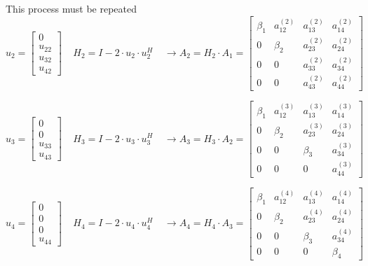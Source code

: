 This process must be repeated
\begin{equation}
u_2 =
\begin{bmatrix}
0\\
u_{22}\\
u_{32}\\
u_{42}
\end{bmatrix}
\;\;\;\;
H_2 = I - 2\cdot u_2\cdot u_2^H
\;\;\;\;
\rightarrow A_2 = H_2\cdot A_1 =
\begin{bmatrix}
\beta_1 & a_{12}^{(2)} & a_{13}^{(2)} & a_{14}^{(2)}\\
0 & \beta_2 & a_{23}^{(2)} & a_{24}^{(2)}\\
0 & 0 & a_{33}^{(2)} & a_{34}^{(2)}\\
0 & 0 & a_{43}^{(2)} & a_{44}^{(2)}
\end{bmatrix}
\end{equation}

\begin{equation}
u_3 =
\begin{bmatrix}
0\\
0\\
u_{33}\\
u_{43}
\end{bmatrix}
\;\;\;\;
H_3 = I - 2\cdot u_3\cdot u_3^H
\;\;\;\;
\rightarrow A_3 = H_3\cdot A_2 =
\begin{bmatrix}
\beta_1 & a_{12}^{(3)} & a_{13}^{(3)} & a_{14}^{(3)}\\
0 & \beta_2 & a_{23}^{(3)} & a_{24}^{(3)}\\
0 & 0 & \beta_3 & a_{34}^{(3)}\\
0 & 0 & 0 & a_{44}^{(3)}
\end{bmatrix}
\end{equation}

\begin{equation}
u_4 =
\begin{bmatrix}
0\\
0\\
0\\
u_{44}
\end{bmatrix}
\;\;\;\;
H_4 = I - 2\cdot u_4\cdot u_4^H
\;\;\;\;
\rightarrow A_4 = H_4\cdot A_3 =
\begin{bmatrix}
\beta_1 & a_{12}^{(4)} & a_{13}^{(4)} & a_{14}^{(4)}\\
0 & \beta_2 & a_{23}^{(4)} & a_{24}^{(4)}\\
0 & 0 & \beta_3 & a_{34}^{(4)}\\
0 & 0 & 0 & \beta_4
\end{bmatrix}
\end{equation}

